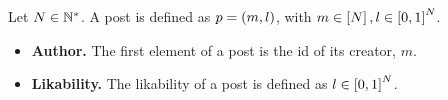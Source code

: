 \begin{definition}[Post]
  Let $N \in \mathbb{N}^*$. A post is defined as $p = \left(m,
  l\right)$, with $m \in \left[N\right], l \in \left[0,
  1\right]^N$.
  \begin{itemize}
    \item \textbf{Author.} The first element of a post is the id of its creator,
    $m$.

    \item \textbf{Likability.} The likability of a post is defined as $l \in
    \left[0, 1\right]^N$.
  \end{itemize}
\end{definition}
